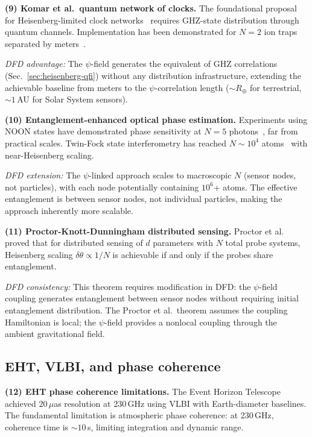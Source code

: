 \documentclass[aps,prl,twocolumn,superscriptaddress,showpacs]{revtex4-2}
\theoremstyle{definition}
\begin{document}
\textbf{(9) Komar et al.\ quantum network of clocks.}
The foundational proposal for Heisenberg-limited clock
networks~\cite{Komar2014} requires GHZ-state distribution through
quantum channels. Implementation has been demonstrated for $N=2$
ion traps separated by meters~\cite{Nichol2022}.

\textit{DFD advantage:} The $\psi$-field generates the equivalent
of GHZ correlations (Sec.~\ref{sec:heisenberg-qfi}) without any
distribution infrastructure, extending the achievable baseline
from meters to the $\psi$-correlation length ($\sim R_\oplus$ for
terrestrial, $\sim 1$\,AU for Solar System sensors).

\textbf{(10) Entanglement-enhanced optical phase estimation.}
Experiments using NOON states have demonstrated phase sensitivity
at $N=5$ photons~\cite{Afek2010}, far from practical scales.
Twin-Fock state interferometry has reached $N \sim 10^4$
atoms~\cite{Lucke2011} with near-Heisenberg scaling.

\textit{DFD extension:} The $\psi$-linked approach scales to
macroscopic $N$ (sensor nodes, not particles), with each node
potentially containing $10^6$+ atoms. The effective entanglement
is between sensor nodes, not individual particles, making the
approach inherently more scalable.

\textbf{(11) Proctor-Knott-Dunningham distributed sensing.}
Proctor et al.~\cite{Proctor2018} proved that for distributed
sensing of $d$ parameters with $N$ total probe systems,
Heisenberg scaling $\delta\theta \propto 1/N$ is achievable
if and only if the probes share entanglement.

\textit{DFD consistency:} This theorem requires modification in
DFD: the $\psi$-field coupling generates entanglement between
sensor nodes without requiring initial entanglement distribution.
The Proctor et al.\ theorem assumes the coupling Hamiltonian is
local; the $\psi$-field provides a nonlocal coupling through the
ambient gravitational field.

\subsection{EHT, VLBI, and phase coherence}

\textbf{(12) EHT phase coherence limitations.}
The Event Horizon Telescope~\cite{EHTC2019a,EHTC2019b} achieved
$20\,\mu$as resolution at 230\,GHz using VLBI with Earth-diameter
baselines. The fundamental limitation is atmospheric phase
coherence: at 230\,GHz, coherence time is $\sim 10$\,s, limiting
integration and dynamic range.
\end{document}
